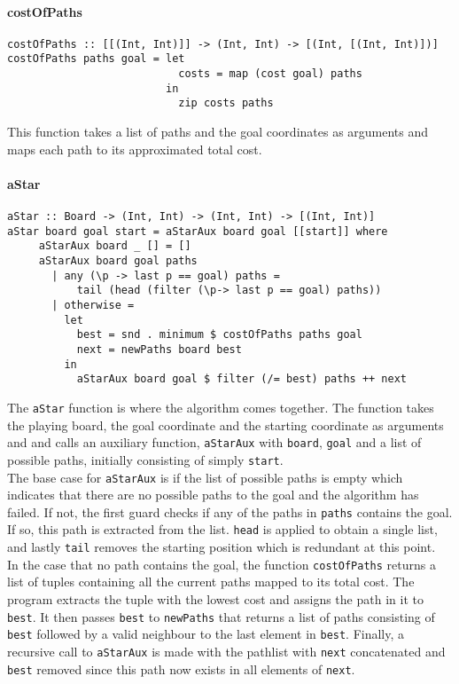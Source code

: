 \documentclass{article}
\begin{document}
\paragraph{costOfPaths}
   \begin{verbatim}
costOfPaths :: [[(Int, Int)]] -> (Int, Int) -> [(Int, [(Int, Int)])]
costOfPaths paths goal = let
                           costs = map (cost goal) paths
                         in
                           zip costs paths
   \end{verbatim}
This function takes a list of paths and the goal coordinates as arguments and maps each path to its approximated total cost.
        \paragraph{aStar}
           \begin{verbatim}
aStar :: Board -> (Int, Int) -> (Int, Int) -> [(Int, Int)]
aStar board goal start = aStarAux board goal [[start]] where
     aStarAux board _ [] = []
     aStarAux board goal paths
       | any (\p -> last p == goal) paths =
           tail (head (filter (\p-> last p == goal) paths))
       | otherwise =
         let
           best = snd . minimum $ costOfPaths paths goal
           next = newPaths board best
         in
           aStarAux board goal $ filter (/= best) paths ++ next
 \end{verbatim}

 The \texttt{aStar} function is where the algorithm comes together. The function takes the playing board, the goal coordinate and the starting coordinate as arguments and and calls an auxiliary function, \texttt{aStarAux} with \texttt{board}, \texttt{goal} and a list of possible paths, initially consisting of simply \texttt{start}.\\
 \newline
 The base case for \texttt{aStarAux} is if the list of possible paths is empty which indicates that there are no possible paths to the goal and the algorithm has failed. If not, the first guard checks if any of the paths in \texttt{paths} contains the goal. If so, this path is extracted from the list. \texttt{head} is applied to obtain a single list, and lastly \texttt{tail} removes the starting position which is redundant at this point.\\
\newline
In the case that no path contains the goal, the function \texttt{costOfPaths} returns a list of tuples containing all the current paths mapped to its total cost. The program extracts the tuple with the lowest cost and assigns the path in it to \texttt{best}. It then passes \texttt{best} to \texttt{newPaths} that returns a list of paths consisting of \texttt{best} followed by a valid neighbour to the last element in \texttt{best}.
Finally, a recursive call to \texttt{aStarAux} is made with the pathlist with \texttt{next} concatenated and \texttt{best} removed since this path now exists in all elements of \texttt{next}.
\end{document}
